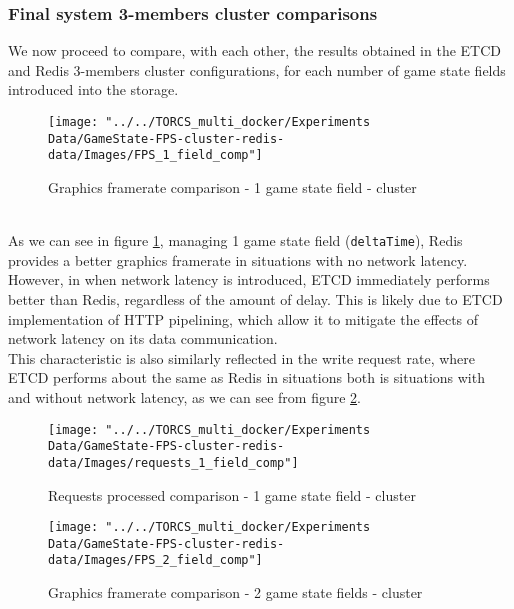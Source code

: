 \subsubsection{Final system 3-members cluster comparisons}
We now proceed to compare, with each other, the results obtained in the ETCD and Redis 3-members cluster configurations, for each number of game state fields introduced into the storage. \\
\begin{figure}[h!]
	\centering
	\texttt{[image: "../../TORCS\_multi\_docker/Experiments Data/GameState-FPS-cluster-redis-data/Images/FPS\_1\_field\_comp"]}
	\caption[Graphics framerate comparison - 1 game state field - cluster]{Graphics framerate comparison - 1 game state field - cluster}
	\label{fig:fps-1-field-comparison-cluster}
\end{figure}
\\ As we can see in figure \ref{fig:fps-1-field-comparison-cluster}, managing 1 game state field (\texttt{deltaTime}), Redis provides a better graphics framerate in situations with no network latency. However, in when network latency is introduced, ETCD immediately performs better than Redis, regardless of the amount of delay. This is likely due to ETCD implementation of HTTP pipelining, which allow it to mitigate the effects of network latency on its data communication. \\
This characteristic is also similarly reflected in the write request rate, where ETCD performs about the same as Redis in situations both is situations with and without network latency, as we can see from figure \ref{fig:requests-1-field-comparison-cluster}. \\
\begin{figure}[h!]
	\centering
	\texttt{[image: "../../TORCS\_multi\_docker/Experiments Data/GameState-FPS-cluster-redis-data/Images/requests\_1\_field\_comp"]}
	\caption[Requests processed comparison - 1 game state field - stand-alone]{Requests processed comparison - 1 game state field - cluster}
	\label{fig:requests-1-field-comparison-cluster}
\end{figure}
\begin{figure}[h!]
	\centering
	\texttt{[image: "../../TORCS\_multi\_docker/Experiments Data/GameState-FPS-cluster-redis-data/Images/FPS\_2\_field\_comp"]}
	\caption[Graphics framerate comparison - 2 game state fields - cluster]{Graphics framerate comparison - 2 game state fields - cluster}
	\label{fig:fps-2-field-comparison-cluster}
\end{figure}
